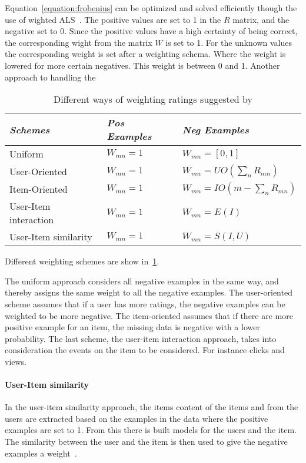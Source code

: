     Equation~\ref{equation:frobenius} can be optimized and solved efficiently
    though the use of wighted ALS~\citep{Koren2009}.  The positive values are set
    to 1 in the $R$ matrix, and the negative set to 0.
    Since the positive values have a high certainty of being correct, the
    corresponding wight from the matrix $W$ is set to 1.  For the unknown values
    the corresponding weight is set after a weighting schema.  Where the weight is
    lowered for more certain negatives.  This weight is between 0 and 1.  Another
    approach to handling the

    \begin{table}[H]
        \centering
        \begin{tabular}{l|l|l}
          \emph{Schemes}      & \emph{Pos Examples} & \emph{Neg Examples} \\ \hline
          Uniform               & $W_{mn} = 1$ & $W_{mn} = [0,1]$ \\ \hline
          User-Oriented         & $W_{mn} = 1$ & $W_{mn} = UO(\sum_{n} R_{mn})$ \\ \hline
          Item-Oriented         & $W_{mn} = 1$ & $W_{mn} = IO(m - \sum_{n} R_{mn})$ \\ \hline
          User-Item interaction & $W_{mn} = 1$ & $W_{mn} = E(I)$  \\ \hline
          User-Item similarity & $W_{mn} = 1$ & $W_{mn} = S(I,U)$  \\
        \end{tabular}
        \caption[Weighting Schemes]{Different ways of weighting ratings suggested by \cite{pan2008}}
        \label{table:WeightingSchemes}
    \end{table}

    Different weighting schemes are show in~\ref{table:WeightingSchemes}.

    The uniform approach considers all negative examples in the same way, and
    thereby assigns the same weight to all the negative examples.  The
    user-oriented scheme assumes that if a user has more ratings, the negative
    examples can be weighted to be more negative.  The item-oriented assumes that
    if there are more positive example for an item, the missing data is negative
    with a lower probability.  The last scheme, the user-item interaction
    approach, takes into consideration the events on the item to be considered.
    For instance clicks and views.

    \paragraph{User-Item similarity} %
        \label{subp:user_item_similarity}
        In the user-item similarity approach, the items content of the items and from the users are extracted based on the examples in the data where the positive examples are set to 1.
        From this there is built models for the users and the item.
        The similarity between the user and the item is then used to give the negative examples a weight~\cite{yuan2013}.

